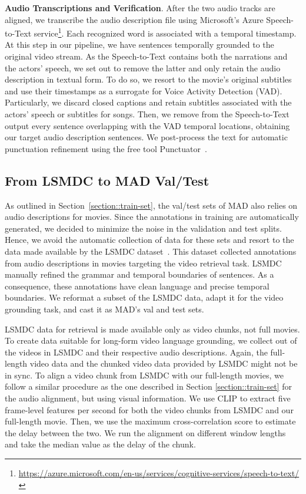 \documentclass[10pt,twocolumn,letterpaper]{article}
\renewcommand{\paragraph}[1]{\vspace{1mm}\noindent\textbf{#1}.}
\begin{document}
\paragraph{Audio Transcriptions and Verification}
After the two audio tracks are aligned, we transcribe the audio description file using Microsoft's Azure Speech-to-Text service\footnote{\url{https://azure.microsoft.com/en-us/services/cognitive-services/speech-to-text/}}. Each recognized word is associated with a temporal timestamp. At this step in our pipeline, we have sentences temporally grounded to the original video stream. As the Speech-to-Text contains both the narrations and the actors' speech, we set out to remove the latter and only retain the audio description in textual form.
To do so, we resort to the movie's original subtitles and use their timestamps as a surrogate for Voice Activity Detection (VAD). Particularly, we discard closed captions and retain subtitles associated with the actors' speech or subtitles for songs. Then, we remove from the Speech-to-Text output every sentence overlapping with the VAD temporal locations, obtaining our target audio description sentences. We post-process the text for automatic punctuation refinement using the free tool Punctuator~\cite{tilk2016}. 


\subsection{From LSMDC to MAD Val/Test}
\label{section::test-set}
As outlined in Section~\ref{section::train-set}, the val/test sets of MAD also relies on audio descriptions for movies. Since the annotations in training  are automatically generated, we decided to minimize the noise in the validation and test splits. Hence, we avoid the automatic collection of data for these sets and resort to the data made available by the LSMDC dataset~\cite{rohrbach2017movie}. This dataset collected annotations from audio descriptions in movies targeting the video retrieval task. LSMDC manually refined the grammar and temporal boundaries of sentences. As a consequence, these annotations have clean language and precise temporal boundaries. We reformat a subset of the LSMDC data, adapt it for the video grounding task, and cast it as MAD's val and test sets.

LSMDC data for retrieval is made available only as video chunks, not full movies. To create data suitable for long-form video language grounding, we collect  out of the  videos in LSMDC and their respective audio descriptions. Again, the full-length video data and the chunked video data provided by LSMDC might not be in sync. To align a video chunk from LSMDC with our full-length movies, we follow a similar procedure as the one described in Section \ref{section::train-set} for the audio alignment, but using visual information. We use CLIP \cite{radford2021learning} to extract five frame-level features per second for both the video chunks from LSMDC and our full-length movie. Then, we use the maximum cross-correlation score to estimate the delay between the two. We run the alignment on  different window lengths and take the median value as the delay of the chunk. 
\end{document}
